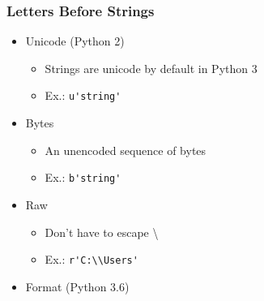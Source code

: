 \documentclass{beamer}
\begin{document}
%
%
\begin{frame}
  \frametitle{Letters Before Strings}
  \begin{itemize}
    \item Unicode (Python 2)
      \begin{itemize}
        \item Strings are unicode by default in Python 3
        \item Ex.: \lstinline{u'string'}
      \end{itemize}

    \item Bytes
      \begin{itemize}
        \item An unencoded sequence of bytes
        \item Ex.: \lstinline{b'string'}
      \end{itemize}

    \item Raw
      \begin{itemize}
	\item Don't have to escape \textbackslash
        \item Ex.: \lstinline{r'C:\\Users'}
      \end{itemize}

    \item Format (Python 3.6) 
    \end{itemize}
  \end{frame}
\end{document}
